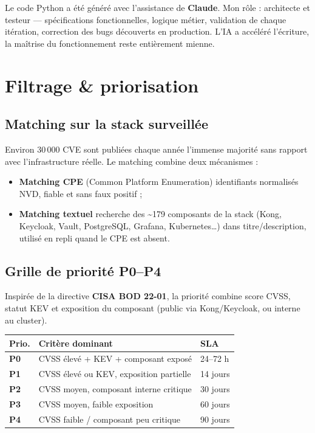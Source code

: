 \documentclass[11pt,a4paper]{article}
\begin{document}
\begin{infobox}[title={\faRobot~Rôle de l'IA générative}]
Le code Python a été généré avec l'assistance de \textbf{Claude}. Mon rôle : architecte et testeur — spécifications fonctionnelles, logique métier, validation de chaque itération, correction des bugs découverts en production. L'IA a accéléré l'écriture, la maîtrise du fonctionnement reste entièrement mienne.
\end{infobox}

\section{Filtrage \& priorisation}

\subsection{Matching sur la stack surveillée}

Environ 30\,000 CVE sont publiées chaque année \textemdash{} l'immense majorité sans rapport avec l'infrastructure réelle. Le matching combine deux mécanismes :

\begin{itemize}
  \item \textbf{Matching CPE} (Common Platform Enumeration) \textemdash{} identifiants normalisés NVD, fiable et sans faux positif ;
  \item \textbf{Matching textuel} \textemdash{} recherche des \hbox{\textasciitilde}179 composants de la stack (Kong, Keycloak, Vault, PostgreSQL, Grafana, Kubernetes\ldots) dans titre/description, utilisé en repli quand le CPE est absent.
\end{itemize}

\subsection{Grille de priorité P0--P4}

Inspirée de la directive \textbf{CISA BOD 22-01}, la priorité combine score CVSS, statut KEV et exposition du composant (public via Kong/Keycloak, ou interne au cluster).

\renewcommand{\arraystretch}{1.3}
\begin{tabularx}{\linewidth}{@{}>{\bfseries}p{1cm} X l@{}}
\toprule
\rowcolor{light} Prio. & Critère dominant & SLA \\ \midrule
P0 & CVSS élevé + KEV + composant exposé & 24--72 h \\
P1 & CVSS élevé ou KEV, exposition partielle & 14 jours \\
P2 & CVSS moyen, composant interne critique & 30 jours \\
P3 & CVSS moyen, faible exposition & 60 jours \\
P4 & CVSS faible / composant peu critique & 90 jours \\
\bottomrule
\end{tabularx}
\end{document}
